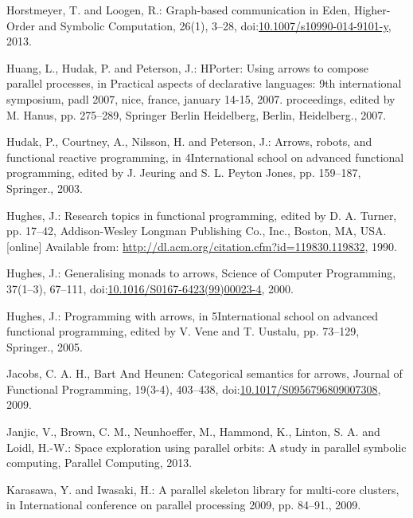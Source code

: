 \documentclass[paper=A4,twoside=true,openright,parskip=full,chapterprefix=true,headings=normal,bibliography=totoc,listof=totoc,titlepage=on,captions=tableabove,draft=false,british]{scrreprt}%
\begin{document}
\leavevmode\hypertarget{ref-Horstmeyer2013}{}%
Horstmeyer, T. and Loogen, R.: Graph-based communication in Eden,
Higher-Order and Symbolic Computation, 26(1), 3--28,
doi:\href{https://doi.org/10.1007/s10990-014-9101-y}{10.1007/s10990-014-9101-y},
2013.

\leavevmode\hypertarget{ref-Huang2007}{}%
Huang, L., Hudak, P. and Peterson, J.: HPorter: Using arrows to compose
parallel processes, in Practical aspects of declarative languages: 9th
international symposium, padl 2007, nice, france, january 14-15, 2007.
proceedings, edited by M. Hanus, pp. 275--289, Springer Berlin
Heidelberg, Berlin, Heidelberg., 2007.

\leavevmode\hypertarget{ref-Hudak2003}{}%
Hudak, P., Courtney, A., Nilsson, H. and Peterson, J.: Arrows, robots,
and functional reactive programming, in 4International school on
advanced functional programming, edited by J. Jeuring and S. L. Peyton
Jones, pp. 159--187, Springer., 2003.

\leavevmode\hypertarget{ref-Hughes:1990:WFP:119830.119832}{}%
Hughes, J.: Research topics in functional programming, edited by D. A.
Turner, pp. 17--42, Addison-Wesley Longman Publishing Co., Inc., Boston,
MA, USA. {[}online{]} Available from:
\url{http://dl.acm.org/citation.cfm?id=119830.119832}, 1990.

\leavevmode\hypertarget{ref-HughesArrows}{}%
Hughes, J.: Generalising monads to arrows, Science of Computer
Programming, 37(1--3), 67--111,
doi:\href{https://doi.org/10.1016/S0167-6423(99)00023-4}{10.1016/S0167-6423(99)00023-4},
2000.

\leavevmode\hypertarget{ref-Hughes2005}{}%
Hughes, J.: Programming with arrows, in 5International school on
advanced functional programming, edited by V. Vene and T. Uustalu, pp.
73--129, Springer., 2005.

\leavevmode\hypertarget{ref-jacobs_heunen_hasuo_2009}{}%
Jacobs, C. A. H., Bart And Heunen: Categorical semantics for arrows,
Journal of Functional Programming, 19(3-4), 403--438,
doi:\href{https://doi.org/10.1017/S0956796809007308}{10.1017/S0956796809007308},
2009.

\leavevmode\hypertarget{ref-janjic2013space}{}%
Janjic, V., Brown, C. M., Neunhoeffer, M., Hammond, K., Linton, S. A.
and Loidl, H.-W.: Space exploration using parallel orbits: A study in
parallel symbolic computing, Parallel Computing, 2013.

\leavevmode\hypertarget{ref-5361825}{}%
Karasawa, Y. and Iwasaki, H.: A parallel skeleton library for multi-core
clusters, in International conference on parallel processing 2009, pp.
84--91., 2009.
\end{document}
